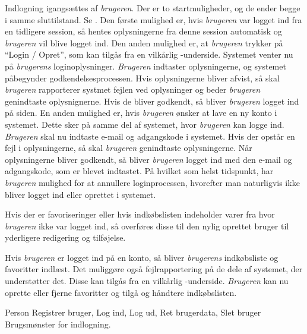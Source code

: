 {Indlogning igangsættes af \textit{brugeren}. Der er to startmuligheder, og de ender begge i samme sluttilstand. Se . Den første mulighed er, hvis \textit{brugeren} var logget ind fra en tidligere session, så hentes oplysningerne fra denne session automatisk og \textit{brugeren} vil blive logget ind. Den anden mulighed er, at \textit{brugeren} trykker på “Login / Opret”, som kan tilgås fra en vilkårlig \Foodl-underside. Systemet venter nu på \textit{brugerens} loginoplysninger. \textit{Brugeren} indtaster oplysningerne, og systemet påbegynder godkendelsesprocessen. Hvis oplysningerne bliver afvist, så skal \textit{brugeren} rapporterer systmet fejlen ved oplysninger og beder \textit{brugeren} genindtaste oplysnignerne. Hvis de bliver godkendt, så bliver \textit{brugeren} logget ind på siden. En anden mulighed er, hvis \textit{brugeren} ønsker at lave en ny konto i systemet. Dette sker på samme del af systemet, hvor \textit{brugeren} kan logge ind. \textit{Brugeren} skal nu indtaste e-mail og adgangskode i systemet. Hvis der opstår en fejl i oplysningerne, så skal \textit{brugeren} genindtaste oplysningerne. Når oplysningerne bliver godkendt, så bliver \textit{brugeren} logget ind med den e-mail og adgangskode, som er blevet indtastet. På hvilket som helst tidspunkt, har \textit{brugeren} mulighed for at annullere loginprocessen, hvorefter man naturligvis ikke bliver logget ind eller oprettet i systemet.

Hvis der er favoriseringer eller hvis indkøbslisten indeholder varer fra hvor \textit{brugeren} ikke var logget ind, så overføres disse til den nylig oprettet bruger til yderligere redigering og tilføjelse.

Hvis \textit{brugeren} er logget ind på en konto, så bliver \textit{brugerens} indkøbsliste og favoritter indlæst. Det muliggøre også fejlrapportering på de dele af systemet, der understøtter det. Disse kan tilgås fra en vilkårlig \Foodl-underside. \textit{Brugeren} kan nu oprette eller fjerne favoritter og tilgå og håndtere indkøbslisten.}
{Person}
{Registrer bruger, Log ind, Log ud, Ret brugerdata, Slet bruger}
{Brugsmønster for indlogning.}
